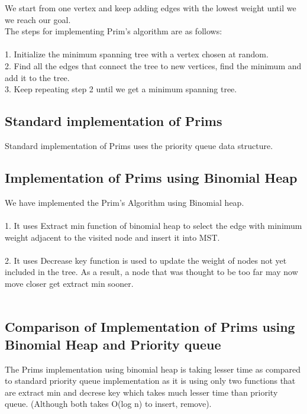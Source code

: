 	We start from one vertex and keep adding edges with the lowest weight until we we reach our goal. \\

The steps for implementing Prim's algorithm are as follows:\\ \\

1. Initialize the minimum spanning tree with a vertex chosen at random.\\
2. Find all the edges that connect the tree to new vertices, find the minimum and add it to the tree.\\
3. Keep repeating step 2 until we get a minimum spanning tree.\\

\subsection*{Standard implementation of Prims}
	Standard implementation of Prims uses the priority queue data structure.
	
\subsection*{Implementation of Prims using Binomial Heap}
	We have implemented the Prim's Algorithm using Binomial heap.\\ \\
	1. It uses Extract min function of binomial heap to select the edge with minimum weight  adjacent to the visited node and insert it into MST. \\ \\
	2. It uses Decrease key function is used to update the weight of nodes not yet included in the tree. As a result, a node that was thought to be too far may now move closer get extract min sooner. \\ \\
	
	
\subsection*{Comparison of Implementation of Prims using Binomial Heap and Priority queue}

The Prims implementation using binomial heap is taking lesser time as compared to standard priority queue implementation as it is using only two functions that are extract min and decrese key which takes much lesser time than priority queue. (Although both takes O(log n) to insert, remove). \\ \\

